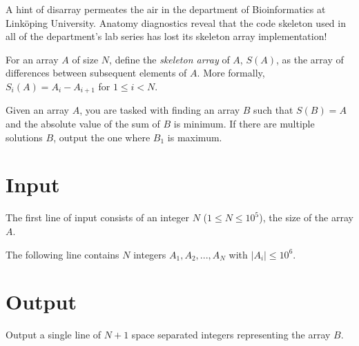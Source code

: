 


A hint of disarray permeates the air in the department of Bioinformatics at Linköping University. 
Anatomy diagnostics reveal that the code skeleton used in all of the department's lab series has lost its
skeleton array implementation!

For an array $A$ of size $N$, define the \textit{skeleton array} of $A$, $S(A)$, as the array of differences between subsequent elements of $A$. 
More formally, $S_i(A) = A_{i} - A_{i+1}$ for $1 \leq i < N$.




Given an array $A$, you are tasked with finding an array $B$ such that $S(B) = A$ and the absolute value of the sum of $B$ is minimum. If there are multiple solutions $B$, output the one where $B_1$ is maximum.



\section*{Input}
The first line of input consists of an integer $N$ ($1 \leq N \leq 10^5$), the size of the array $A$.

The following line contains $N$ integers $A_1, A_2, ..., A_N$ with $|A_i| \leq 10^6$.

\section*{Output}
Output a single line of $N+1$ space separated integers representing the array $B$.